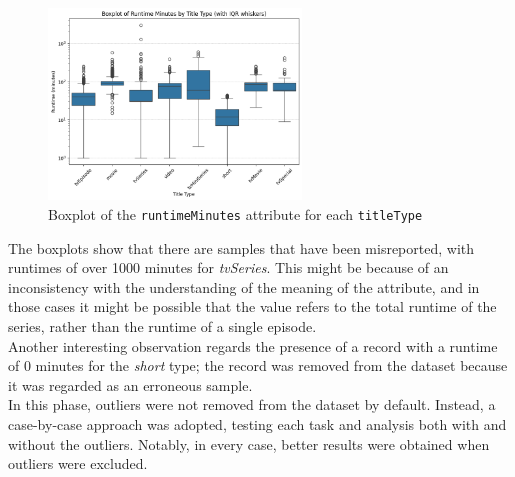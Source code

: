 \begin{figure}[H]
    \centering
        \includegraphics[width=0.6\textwidth]{plots/outliers.png}
        \caption{Boxplot of the \texttt{runtimeMinutes} attribute for each \texttt{titleType}}
        \label{fig:runtimeMinutes_boxplot}
    \captionsetup{justification=centering}
    \label{fig:outliers}
\end{figure}

The boxplots show that there are samples that have been misreported, with runtimes of over 1000 minutes for \textit{tvSeries}.
This might be because of an inconsistency with the understanding of the meaning of the attribute, and in those cases it might be possible that
the value refers to the total runtime of the series, rather than the runtime of a single episode.\\


Another interesting observation regards the presence of a record with a runtime of 0 minutes for the \textit{short} type;
the record was removed from the dataset because it was regarded as an erroneous sample.\\

In this phase, outliers were not removed from the dataset by default. Instead, a case-by-case approach was adopted,
testing each task and analysis both with and without the outliers. Notably, in every case, better results were obtained when outliers were excluded.